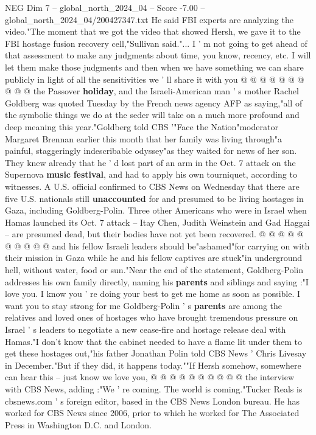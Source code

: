 \begin{textsample}{NEG Dim 7 – global\_north\_2024\_04 – Score -7.00 – global\_north\_2024\_04/200427347.txt}
He said FBI experts are analyzing the video."The moment that we got the video that showed Hersh, we gave it to the FBI hostage fusion recovery cell,"Sullivan said."...
I ' m not going to get ahead of that assessment to make any judgments about time, you know, recency, etc.
I will let them make those judgments and then when we have something we can share publicly in light of all the sensitivities we ' ll share it with you @ @ @ @ @ @ @ @ @ @ the Passover \textbf{holiday}, and the Israeli-American man ' s mother Rachel Goldberg was quoted Tuesday by the French news agency AFP as saying,"all of the symbolic things we do at the seder will take on a much more profound and deep meaning this year."Goldberg told CBS '"Face the Nation"moderator Margaret Brennan earlier this month that her family was living through"a painful, staggeringly indescribable odyssey"as they waited for news of her son.
They knew already that he ' d lost part of an arm in the Oct. 7 attack on the Supernova \textbf{music} \textbf{festival}, and had to apply his own tourniquet, according to witnesses.
A U.S. official confirmed to CBS News on Wednesday that there are five U.S. nationals still \textbf{unaccounted} for and presumed to be living hostages in Gaza, including Goldberg-Polin.
Three other Americans who were in Israel when Hamas launched its Oct. 7 attack -- Itay Chen, Judith Weinstein and Gad Haggai -- are presumed dead, but their bodies have not yet been recovered. @ @ @ @ @ @ @ @ @ @ and his fellow Israeli leaders should be"ashamed"for carrying on with their mission in Gaza while he and his fellow captives are stuck"in underground hell, without water, food or sun."Near the end of the statement, Goldberg-Polin addresses his own family directly, naming his \textbf{parents} and siblings and saying :"I love you.
I know you ' re doing your best to get me home as soon as possible.
I want you to stay strong for me Goldberg-Polin ' s \textbf{parents} are among the relatives and loved ones of hostages who have brought tremendous pressure on Israel ' s leaders to negotiate a new cease-fire and hostage release deal with Hamas."I don't know that the cabinet needed to have a flame lit under them to get these hostages out,"his father Jonathan Polin told CBS News ' Chris Livesay in December."But if they did, it happens today.""If Hersh somehow, somewhere can hear this -- just know we love you, @ @ @ @ @ @ @ @ @ @ the interview with CBS News, adding :"We ' re coming.
The world is coming."Tucker Reals is cbsnews.com ' s foreign editor, based in the CBS News London bureau.
He has worked for CBS News since 2006, prior to which he worked for The Associated Press in Washington D.C. and London.

\end{textsample}
